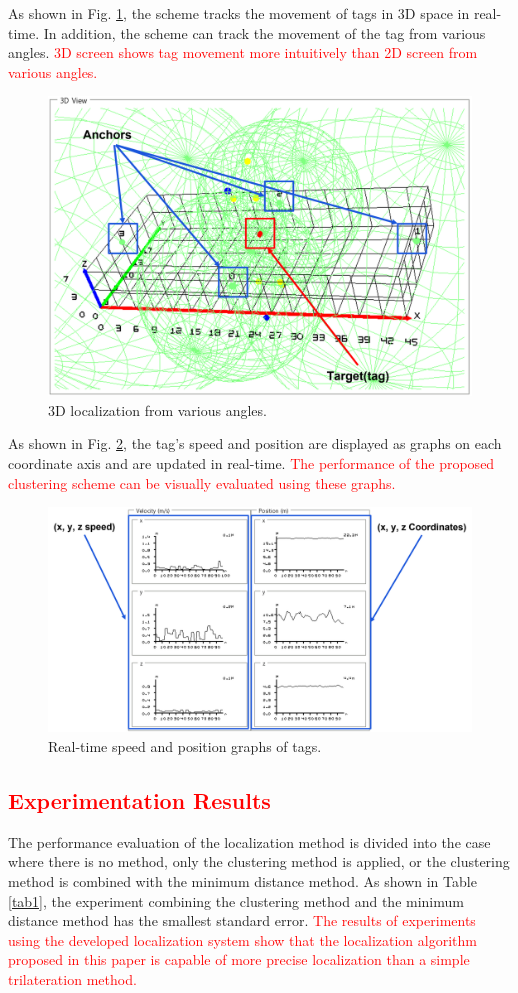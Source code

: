 \documentclass[conference]{IEEEtran}
\begin{document}
As shown in Fig. \ref{fig8}, the scheme tracks the movement of tags in 3D space in real-time. In addition, the scheme can track the movement of the tag from various angles. \textcolor{red}{3D screen shows tag movement more intuitively than 2D screen from various angles.}

\begin{figure}[htbp]
    \centerline{\includegraphics[width=0.8\columnwidth]{fig8.png}}
    \caption{3D localization from various angles.}
    \label{fig8}
\end{figure}

As shown in Fig. \ref{fig9}, the tag's speed and position are displayed as graphs on each coordinate axis and are updated in real-time. \textcolor{red}{The performance of the proposed clustering scheme can be visually evaluated using these graphs.}

\begin{figure}[htbp]
    \centerline{\includegraphics[width=0.8\columnwidth]{fig9.png}}
    \caption{Real-time speed and position graphs of tags.}
    \label{fig9}
\end{figure}

\subsection{\textcolor{red}{Experimentation Results}}
The performance evaluation of the localization method is divided into the case where there is no method, only the clustering method is applied, or the clustering method is combined with the minimum distance method. As shown in Table \ref{tab1}, the experiment combining the clustering method and the minimum distance method has the smallest standard error. \textcolor{red}{The results of experiments using the developed localization system show that the localization algorithm proposed in this paper is capable of more precise localization than a simple trilateration method.}
\end{document}
